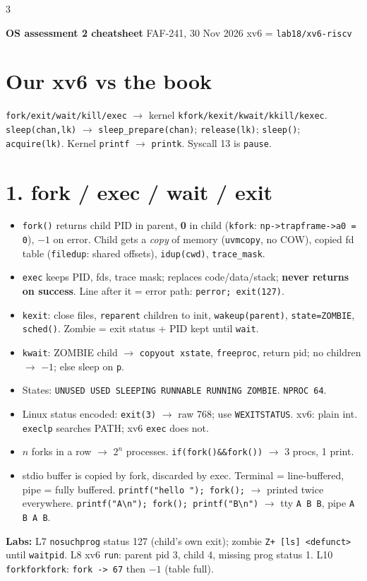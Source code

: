 \documentclass[9pt]{extarticle}
\newcommand{\cc}[1]{\texttt{#1}}
\newcommand{\ra}{$\rightarrow$}
\begin{document}
\begin{multicols*}{3}\RaggedRight
\centerline{\textbf{OS assessment 2 cheatsheet} \quad FAF-241, 30 Nov 2026 \quad xv6 = \cc{lab18/xv6-riscv}}

\section{Our xv6 vs the book}
\cc{fork/exit/wait/kill/exec} \ra{} kernel \cc{kfork/kexit/kwait/kkill/kexec}. \cc{sleep(chan,lk)} \ra{} \cc{sleep\_prepare(chan)}; \cc{release(lk)}; \cc{sleep()}; \cc{acquire(lk)}. Kernel \cc{printf} \ra{} \cc{printk}. Syscall 13 is \cc{pause}.

\section{1. fork / exec / wait / exit}
\begin{itemize}
\item \cc{fork()} returns child PID in parent, \textbf{0} in child (\cc{kfork}: \cc{np->trapframe->a0 = 0}), $-1$ on error. Child gets a \emph{copy} of memory (\cc{uvmcopy}, no COW), copied fd table (\cc{filedup}: shared offsets), \cc{idup(cwd)}, \cc{trace\_mask}.
\item \cc{exec} keeps PID, fds, trace mask; replaces code/data/stack; \textbf{never returns on success}. Line after it = error path: \cc{perror; exit(127)}.
\item \cc{kexit}: close files, \cc{reparent} children to init, \cc{wakeup(parent)}, \cc{state=ZOMBIE}, \cc{sched()}. Zombie = exit status + PID kept until \cc{wait}.
\item \cc{kwait}: ZOMBIE child \ra{} \cc{copyout xstate}, \cc{freeproc}, return pid; no children \ra{} $-1$; else sleep on \cc{p}.
\item States: \cc{UNUSED USED SLEEPING RUNNABLE RUNNING ZOMBIE}. \cc{NPROC 64}.
\item Linux status encoded: \cc{exit(3)} \ra{} raw 768; use \cc{WEXITSTATUS}. xv6: plain int. \cc{execlp} searches PATH; xv6 \cc{exec} does not.
\item $n$ forks in a row \ra{} $2^n$ processes. \cc{if(fork()\&\&fork())} \ra{} 3 procs, 1 print.
\item stdio buffer is copied by fork, discarded by exec. Terminal = line-buffered, pipe = fully buffered. \cc{printf("hello "); fork();} \ra{} printed twice everywhere. \cc{printf("A\textbackslash n"); fork(); printf("B\textbackslash n")} \ra{} tty \cc{A B B}, pipe \cc{A B A B}.
\end{itemize}
\textbf{Labs:} L7 \cc{nosuchprog} status 127 (child's own exit); zombie \cc{Z+ [ls] <defunct>} until \cc{waitpid}. L8 xv6 \cc{run}: parent pid 3, child 4, missing prog status 1. L10 \cc{forkforkfork}: \cc{fork -> 67} then $-1$ (table full).


\end{multicols*}
\end{document}
